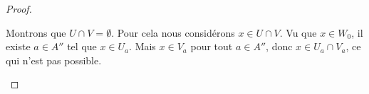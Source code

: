\begin{proof}
\begin{subproof}
		Montrons que \( U\cap V=\emptyset\). Pour cela nous considérons \( x\in U\cap V\). Vu que \( x\in W_0\), il existe \( a\in A''\) tel que \( x\in U_a\). Mais \( x\in V_a\) pour tout \( a\in A''\), donc \( x\in U_a\cap V_a\), ce qui n'est pas possible.
	\end{subproof}
\end{proof}
